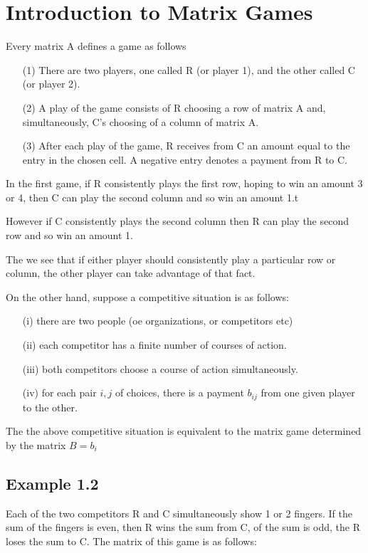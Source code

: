 \documentclass[]{report}
\begin{document}
\section{Introduction to Matrix Games}
Every matrix A defines a game as follows
\begin{itemize}
\item[(1)] There are two players, one called R (or player 1), and the other called C (or player 2).
\item[(2)] A play of the game consists of R choosing a row of matrix A and, simultaneously, C's choosing of a column of matrix A.
\item[(3)] After each play of the game, R receives from C an amount equal to the entry in the chosen cell. A negative entry denotes a payment from R to C.

\end{itemize}


In the first game, if R consistently plays the first row, hoping to win an amount 3 or 4, then C can play the second column
and so win an amount 1.t

However if C consistently plays the second column then R can play the second row and so win an amount 1.

The we see that if either player should consistently play a particular row or column, the other player can take advantage of that fact.

On the other hand, suppose a competitive situation is as follows:
\begin{itemize},j
\item[(i)] there are two people (oe organizations, or competitors etc)
\item[(ii)] each competitor has a finite number of courses of action.
\item[(iii)] both competitors choose a course of action simultaneously.
\item[(iv)] for each pair $i,j$ of choices, there is a payment $b_{ij}$ from one given player to the other.
\end{itemize}

The the above competitive situation is equivalent to the matrix game determined by the matrix $B=b_{i}$
\subsection{Example 1.2}
Each of the two competitors R and C simultaneously show 1 or 2 fingers. If the sum of the fingers is even, then R wins the sum from C, of the sum is odd, the R loses the sum to C. The matrix of this game is as follows:
\end{document}
